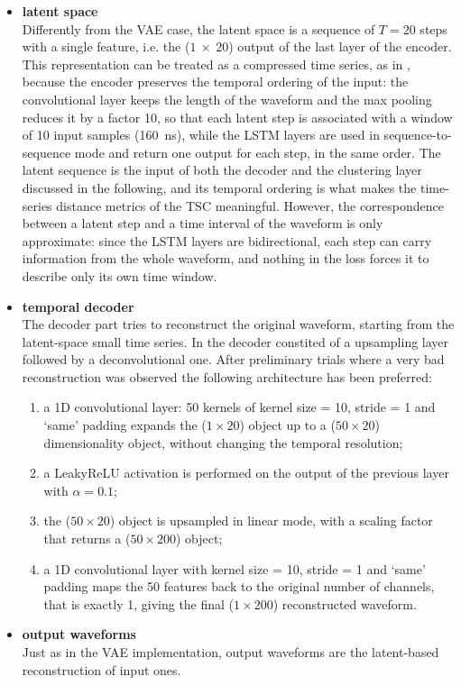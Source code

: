 \begin{itemize}
    \item \textbf{latent space}\\
    Differently from the \ac{VAE} case, the latent space is a sequence of $T = 20$ steps with a single feature, i.e. the ($1~\times~20$) output of the last layer of the encoder. This representation can be treated as a compressed time series, as in \cite{DTC}, because the encoder preserves the temporal ordering of the input: the convolutional layer keeps the length of the waveform and the max pooling reduces it by a factor 10, so that each latent step is associated with a window of 10 input samples (160~ns), while the \ac{LSTM} layers are used in sequence-to-sequence mode and return one output for each step, in the same order. The latent sequence is the input of both the decoder and the clustering layer discussed in the following, and its temporal ordering is what makes the time-series distance metrics of the \ac{TSC} meaningful. However, the correspondence between a latent step and a time interval of the waveform is only approximate: since the \ac{LSTM} layers are bidirectional, each step can carry information from the whole waveform, and nothing in the loss forces it to describe only its own time window.

    \item \textbf{temporal decoder}\\
    The decoder part tries to reconstruct the original waveform, starting from the latent-space small time series. In \cite{DTC} the decoder constited of a upsampling layer followed by a deconvolutional one. After preliminary trials where a very bad reconstruction was observed the following architecture has been preferred:
    \begin{enumerate}
        \item a 1D convolutional layer: 50 kernels of kernel size = 10, stride = 1 and ‘same’ padding expands the ($1 \times 20$) object up to a ($50 \times 20$) dimensionality object, without changing the temporal resolution;
        \item a LeakyReLU activation is performed on the output of the previous layer with $\alpha = 0.1$;
        \item the ($50 \times 20$) object is upsampled in linear mode, with a scaling factor that returns a ($50 \times 200$) object;
        \item a 1D convolutional layer with kernel size = 10, stride = 1 and ‘same’ padding maps the 50 features back to the original number of channels, that is exactly 1, giving the final ($1 \times 200$) reconstructed waveform.
    \end{enumerate}

    \item \textbf{output waveforms}\\
    Just as in the \ac{VAE} implementation, output waveforms are the latent-based reconstruction of input ones.
\end{itemize}

